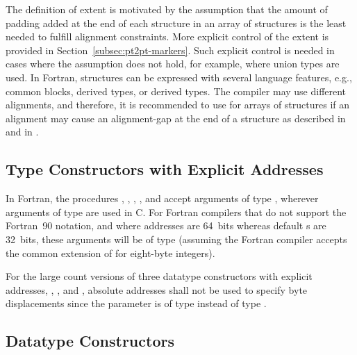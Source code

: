 \begin{rationale}
The definition of extent is motivated by the assumption that
the amount of padding added at the end of each structure in an array of
structures is the least needed to fulfill alignment constraints.
More explicit control of the extent is provided in
Section~\ref{subsec:pt2pt-markers}.  Such explicit control is needed
in cases where the assumption does not hold, for example, where union types
are used.
In Fortran, structures can be expressed with several language features, e.g.,
common blocks,  derived types, or  derived types. The compiler may
use different alignments, and therefore, it is recommended to use 
for arrays of structures if an alignment may cause an alignment-gap at the end of
a structure as described
in  and
in .
\end{rationale}




\subsection{Type Constructors with Explicit Addresses}
\label{sec:misc-extent}
In Fortran, the procedures
,\flushline  %
,
,
, and 
accept arguments of type
, wherever arguments of type
%
are used in C.
For Fortran compilers that do not support the Fortran~90 
notation, and where addresses are 64~bits whereas default s
are 32~bits, these arguments will be of type  (assuming
the Fortran compiler accepts the common extension of 
for eight-byte integers).

For the large count versions of three datatype constructors with explicit addresses,
, , and
, absolute addresses shall not be used to
specify byte displacements since the parameter is of type 
instead of type .

\subsection{Datatype Constructors}
\label{subsec:pt2pt-datatypeconst}

